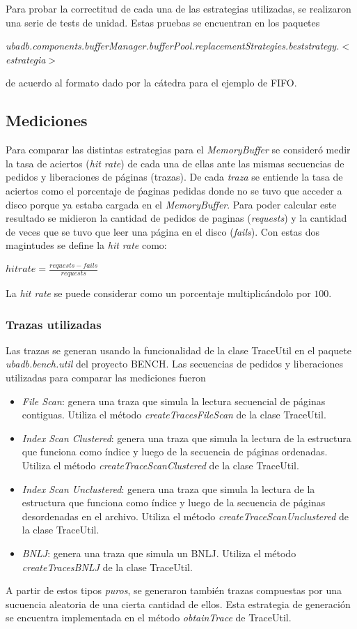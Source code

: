 Para probar la correctitud de cada una de las estrategias utilizadas, se realizaron una serie de tests de unidad. Estas pruebas se encuentran en los paquetes

\textit{ubadb.components.bufferManager.bufferPool.replacementStrategies.beststrategy.$<$estrategia$>$}

de acuerdo al formato dado por la c\'atedra para el ejemplo de FIFO.


\subsection{Mediciones}
Para comparar las distintas estrategias para el \textit{MemoryBuffer} se consider\'o medir
la tasa de aciertos (\textit{hit rate}) de cada una de ellas ante las mismas secuencias 
de pedidos y liberaciones de p\'aginas (trazas). De cada \textit{traza} se entiende la tasa
de aciertos como el porcentaje de \'paginas pedidas donde no se tuvo que acceder a disco
porque ya estaba cargada en el \textit{MemoryBuffer}. Para poder calcular este resultado
se midieron la cantidad de pedidos de paginas (\textit{requests}) y la cantidad de veces
que se tuvo que leer una p\'agina en el disco (\textit{fails}). Con estas dos magintudes
se define la \textit{hit rate} como: \\
\begin{center}
$hit rate = \frac{requests-fails}{requests}$  
\end{center}
La \textit{hit rate} se puede considerar como un porcentaje multiplic\'andolo por $100$.

\subsubsection{Trazas utilizadas}
Las trazas se generan usando la funcionalidad de la clase TraceUtil en el paquete \textit{ubadb.bench.util} del proyecto BENCH. 
Las secuencias de pedidos y liberaciones utilizadas para comparar las mediciones fueron
\begin{itemize}
\item \textit{File Scan}: genera una traza que simula la lectura secuencial de p\'aginas contiguas. Utiliza el m\'etodo \textit{createTracesFileScan} de la clase TraceUtil.
\item \textit{Index Scan Clustered}: genera una traza que simula la lectura de la estructura que funciona como \'indice y luego de la secuencia de p\'aginas ordenadas. Utiliza el m\'etodo \textit{createTraceScanClustered} de la clase TraceUtil.
\item \textit{Index Scan Unclustered}: genera una traza que simula la lectura de la estructura que funciona como \'indice y luego de la secuencia de p\'aginas desordenadas en el archivo. Utiliza el m\'etodo \textit{createTraceScanUnclustered} de la clase TraceUtil.
\item \textit{BNLJ}: genera una traza que simula un BNLJ. Utiliza el m\'etodo \textit{createTracesBNLJ} de la clase TraceUtil.
\end{itemize}

A partir de estos tipos \textit{puros}, se generaron tambi\'en trazas compuestas por una sucuencia aleatoria de una cierta cantidad de ellos. Esta estrategia de generaci\'on se encuentra implementada en el m\'etodo \textit{obtainTrace} de TraceUtil.
